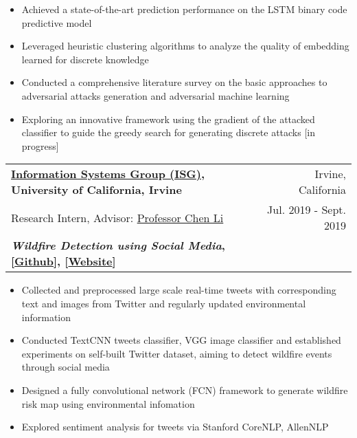 \documentclass[letterpaper,11pt]{article}
\makeatletter
\newcommand{\resumeSubheading}[6]{
  \vspace{-1pt}\item
    \begin{tabular*}{0.97\textwidth}[t]{l@{\extracolsep{\fill}}r}
      \textbf{#1} & #2 \\
      #3 & #4 \\
      \textbf{#5} & \textbf{#6} \\
    \end{tabular*}\vspace{-5pt}
}
\makeatother
\begin{document}
        \begin{itemize}
            \item Achieved a state-of-the-art prediction performance on the LSTM binary code predictive model
          
          \item Leveraged heuristic clustering algorithms to analyze the quality of embedding learned for discrete knowledge

          \item Conducted a comprehensive literature survey on the basic approaches to adversarial attacks generation and adversarial machine learning
          
          \item Exploring an innovative framework using the gradient of the attacked classifier to guide the greedy search for generating discrete attacks [in progress]
          
        \end{itemize}
        
    \resumeSubheading
      {\href{https://isg.ics.uci.edu/}{Information Systems Group (ISG)}, University of California, Irvine}{Irvine, California}
      {Research Intern, Advisor: \href{https://chenli.ics.uci.edu/}{Professor Chen Li}}{Jul. 2019 - Sept. 2019}
      {\textit{Wildfire Detection using Social Media}, [\href{https://github.com/ISG-ICS/Wildfires}{Github}], [\href{http://wildfires.ics.uci.edu:2333/}{Website}]}{}
      
        \begin{itemize}
          \item Collected and preprocessed large scale real-time tweets with corresponding text and images from Twitter and regularly updated environmental information
          
          \item Conducted TextCNN tweets classifier, VGG image classifier and established experiments on self-built Twitter dataset, aiming to detect wildfire events through social media
          
          \item Designed a fully convolutional network (FCN) framework to generate wildfire risk map using environmental infomation
          
          \item Explored sentiment analysis for tweets via Stanford CoreNLP, AllenNLP
        \end{itemize}
        
\end{document}

